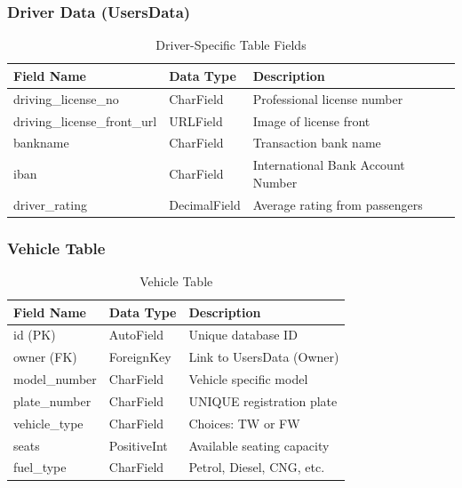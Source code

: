 \subsubsection{Driver Data (UsersData)}
\begin{table}[H]
\centering
\caption{Driver-Specific Table Fields}
\renewcommand{\arraystretch}{1.5}
\begin{tabular}{|p{3cm}|p{3.5cm}|p{7cm}|}
\hline
\textbf{Field Name} & \textbf{Data Type} & \textbf{Description} \\
\hline
driving\_license\_no & CharField & Professional license number \\
\hline
driving\_license\_front\_url & URLField & Image of license front \\
\hline
bankname & CharField & Transaction bank name \\
\hline
iban & CharField & International Bank Account Number \\
\hline
driver\_rating & DecimalField & Average rating from passengers \\
\hline
\end{tabular}
\end{table}

\subsubsection{Vehicle Table}
\begin{table}[H]
\centering
\caption{Vehicle Table}
\renewcommand{\arraystretch}{1.5}
\begin{tabular}{|p{3cm}|p{3.5cm}|p{7cm}|}
\hline
\textbf{Field Name} & \textbf{Data Type} & \textbf{Description} \\
\hline
id (PK) & AutoField & Unique database ID \\
\hline
owner (FK) & ForeignKey & Link to UsersData (Owner) \\
\hline
model\_number & CharField & Vehicle specific model \\
\hline
plate\_number & CharField & UNIQUE registration plate \\
\hline
vehicle\_type & CharField & Choices: TW or FW \\
\hline
seats & PositiveInt & Available seating capacity \\
\hline
fuel\_type & CharField & Petrol, Diesel, CNG, etc. \\
\hline
\end{tabular}
\end{table}

